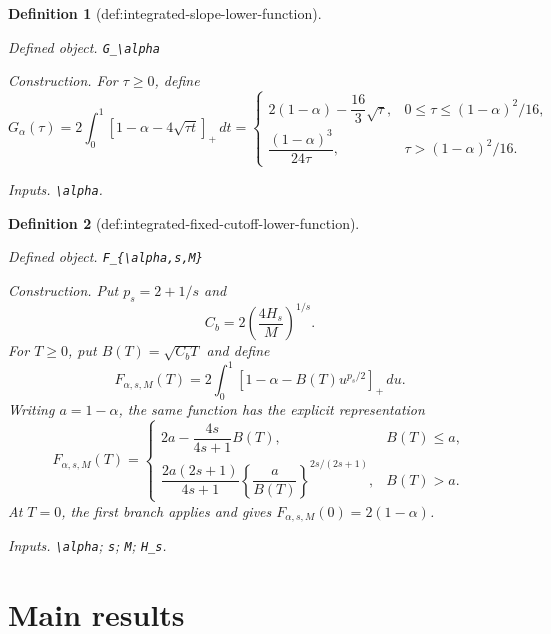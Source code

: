 \documentclass{article}
\newtheorem{definition}{Definition}
\begin{document}
\begin{definition}[def:integrated-slope-lower-function]\label{def:integrated-slope-lower-function}
\par\smallskip\noindent\emph{Defined object.} \texttt{G\_\allowbreak{}\textbackslash{}\allowbreak{}alpha}
\par\smallskip\noindent\emph{Construction.} For \(\tau\ge0\), define
\[
 G_\alpha(\tau)
 =2\int_0^1[1-\alpha-4\sqrt{\tau t}]_+\,dt
 =\begin{cases}
 2(1-\alpha)-\dfrac{16}{3}\sqrt\tau,
   &0\le\tau\le(1-\alpha)^2/16,\\[6pt]
 \dfrac{(1-\alpha)^3}{24\tau},
   &\tau>(1-\alpha)^2/16.
 \end{cases}
\]
\par\smallskip\noindent\emph{Inputs.} \texttt{\textbackslash{}\allowbreak{}alpha}.
\end{definition}

\begin{definition}[def:integrated-fixed-cutoff-lower-function]\label{def:integrated-fixed-cutoff-lower-function}
\par\smallskip\noindent\emph{Defined object.} \texttt{F\_\allowbreak{}\{\textbackslash{}\allowbreak{}alpha,\allowbreak{}s,\allowbreak{}M\}\allowbreak{}}
\par\smallskip\noindent\emph{Construction.} Put \(p_s=2+1/s\) and
\[
 C_b=2\left(\frac{4H_s}{M}\right)^{1/s}.
\]
For \(T\ge0\), put \(B(T)=\sqrt{C_bT}\) and define
\[
 F_{\alpha,s,M}(T)
 =2\int_0^1\left[1-\alpha-B(T)u^{p_s/2}\right]_+\,du.
\]
Writing \(a=1-\alpha\), the same function has the explicit representation
\[
 F_{\alpha,s,M}(T)
 =\begin{cases}
 2a-\dfrac{4s}{4s+1}B(T),& B(T)\le a,\\[6pt]
 \dfrac{2a(2s+1)}{4s+1}
 \left\{\dfrac{a}{B(T)}\right\}^{2s/(2s+1)},&B(T)>a.
 \end{cases}
\]
At \(T=0\), the first branch applies and gives \(F_{\alpha,s,M}(0)=2(1-\alpha)\).
\par\smallskip\noindent\emph{Inputs.} \texttt{\textbackslash{}\allowbreak{}alpha}; \texttt{s}; \texttt{M}; \texttt{H\_\allowbreak{}s}.
\end{definition}

\section{Main results}
\end{document}
